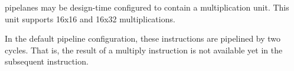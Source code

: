 \rvex{} pipelanes may be design-time configured to contain a multiplication
unit. This unit supports 16x16 and 16x32 multiplications.

In the default pipeline configuration, these instructions are pipelined by
two cycles. That is, the result of a multiply instruction is not available yet
in the subsequent instruction.

\vskip 10pt
\noindent\begin{minipage}{\textwidth}
\label{opc:MPYLL}
\noindent\textbf{\footnotesize\texttt{}}

\noindent\textbf{\footnotesize\texttt{}}


\end{minipage}

